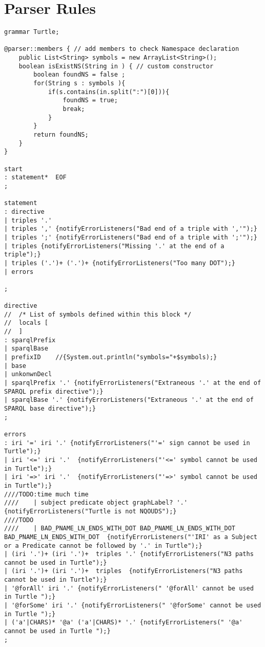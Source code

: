 \appendix

\chapter{Parser Rules}
\label{ch:appendix}

\begin{lstlisting}[breaklines,basicstyle=\ttfamily]
grammar Turtle;

@parser::members { // add members to check Namespace declaration
	public List<String> symbols = new ArrayList<String>();
	boolean isExistNS(String in ) { // custom constructor
		boolean foundNS = false ; 
		for(String s : symbols ){
			if(s.contains(in.split(":")[0])){
				foundNS = true; 
				break;
			}
		}
		return foundNS;
	}
}

start
: statement*  EOF
;

statement
: directive
| triples '.'
| triples ',' {notifyErrorListeners("Bad end of a triple with ','");}
| triples ';' {notifyErrorListeners("Bad end of a triple with ';'");}
| triples {notifyErrorListeners("Missing '.' at the end of a triple");}
| triples ('.')+ ('.')+ {notifyErrorListeners("Too many DOT");}
| errors		

;

directive
//	/* List of symbols defined within this block */
//	locals [
//	]
: sparqlPrefix
| sparqlBase 
| prefixID    //{System.out.println("symbols="+$symbols);}
| base
| unkonwnDecl
| sparqlPrefix '.' {notifyErrorListeners("Extraneous '.' at the end of SPARQL prefix directive");}
| sparqlBase '.' {notifyErrorListeners("Extraneous '.' at the end of SPARQL base directive");}
;

errors	
: iri '=' iri '.' {notifyErrorListeners("'=' sign cannot be used in Turtle");}
| iri '<=' iri '.'  {notifyErrorListeners("'<=' symbol cannot be used in Turtle");}
| iri '=>' iri '.'  {notifyErrorListeners("'=>' symbol cannot be used in Turtle");}
////TODO:time much time
////    | subject predicate object graphLabel? '.' {notifyErrorListeners("Turtle is not NQOUDS");}
////TODO
//// 	| BAD_PNAME_LN_ENDS_WITH_DOT BAD_PNAME_LN_ENDS_WITH_DOT  BAD_PNAME_LN_ENDS_WITH_DOT  {notifyErrorListeners("'IRI' as a Subject or a Predicate cannot be followed by '.' in Turtle");}
| (iri '.')+ (iri '.')+  triples '.' {notifyErrorListeners("N3 paths cannot be used in Turtle");}
| (iri '.')+ (iri '.')+  triples  {notifyErrorListeners("N3 paths cannot be used in Turtle");}
| '@forAll' iri '.' {notifyErrorListeners(" '@forAll' cannot be used in Turtle ");}
| '@forSome' iri '.' {notifyErrorListeners(" '@forSome' cannot be used in Turtle ");}
| ('a'|CHARS)* '@a' ('a'|CHARS)* '.' {notifyErrorListeners(" '@a' cannot be used in Turtle ");}
;



\end{lstlisting}
